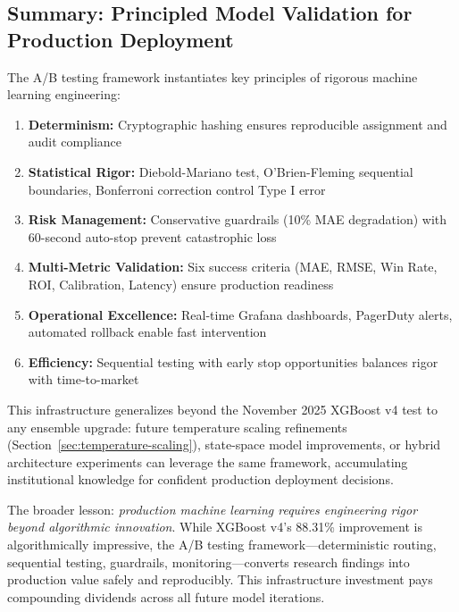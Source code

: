 \subsection{Summary: Principled Model Validation for Production Deployment}

The A/B testing framework instantiates key principles of rigorous machine learning engineering:

\begin{enumerate}[itemsep=3pt,parsep=0pt]
    \item \textbf{Determinism:} Cryptographic hashing ensures reproducible assignment and audit compliance
    \item \textbf{Statistical Rigor:} Diebold-Mariano test, O'Brien-Fleming sequential boundaries, Bonferroni correction control Type I error
    \item \textbf{Risk Management:} Conservative guardrails (10\% MAE degradation) with 60-second auto-stop prevent catastrophic loss
    \item \textbf{Multi-Metric Validation:} Six success criteria (MAE, RMSE, Win Rate, ROI, Calibration, Latency) ensure production readiness
    \item \textbf{Operational Excellence:} Real-time Grafana dashboards, PagerDuty alerts, automated rollback enable fast intervention
    \item \textbf{Efficiency:} Sequential testing with early stop opportunities balances rigor with time-to-market
\end{enumerate}

This infrastructure generalizes beyond the November 2025 XGBoost v4 test to any ensemble upgrade: future temperature scaling refinements (Section~\ref{sec:temperature-scaling}), state-space model improvements, or hybrid architecture experiments can leverage the same framework, accumulating institutional knowledge for confident production deployment decisions.

The broader lesson: \emph{production machine learning requires engineering rigor beyond algorithmic innovation}. While XGBoost v4's 88.31\% improvement is algorithmically impressive, the A/B testing framework---deterministic routing, sequential testing, guardrails, monitoring---converts research findings into production value safely and reproducibly. This infrastructure investment pays compounding dividends across all future model iterations.
